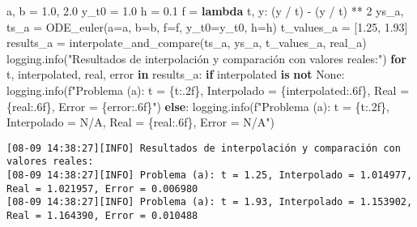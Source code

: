 \documentclass[
  letterpaper,
  DIV=11,
  numbers=noendperiod]{scrartcl}
\newenvironment{Shaded}{\begin{snugshade}}{\end{snugshade}}
\newcommand{\ControlFlowTok}[1]{\textcolor[rgb]{0.00,0.23,0.31}{\textbf{#1}}}
\newcommand{\DecValTok}[1]{\textcolor[rgb]{0.68,0.00,0.00}{#1}}
\newcommand{\FloatTok}[1]{\textcolor[rgb]{0.68,0.00,0.00}{#1}}
\newcommand{\KeywordTok}[1]{\textcolor[rgb]{0.00,0.23,0.31}{\textbf{#1}}}
\newcommand{\NormalTok}[1]{\textcolor[rgb]{0.00,0.23,0.31}{#1}}
\newcommand{\OperatorTok}[1]{\textcolor[rgb]{0.37,0.37,0.37}{#1}}
\newcommand{\SpecialCharTok}[1]{\textcolor[rgb]{0.37,0.37,0.37}{#1}}
\newcommand{\SpecialStringTok}[1]{\textcolor[rgb]{0.13,0.47,0.30}{#1}}
\newcommand{\StringTok}[1]{\textcolor[rgb]{0.13,0.47,0.30}{#1}}
\newcommand{\VariableTok}[1]{\textcolor[rgb]{0.07,0.07,0.07}{#1}}
\begin{document}
\begin{Shaded}
\begin{Highlighting}[]
\NormalTok{a, b }\OperatorTok{=} \FloatTok{1.0}\NormalTok{, }\FloatTok{2.0}
\NormalTok{y\_t0 }\OperatorTok{=} \FloatTok{1.0}
\NormalTok{h }\OperatorTok{=} \FloatTok{0.1}
\NormalTok{f }\OperatorTok{=} \KeywordTok{lambda}\NormalTok{ t, y: (y }\OperatorTok{/}\NormalTok{ t) }\OperatorTok{{-}}\NormalTok{ (y }\OperatorTok{/}\NormalTok{ t) }\OperatorTok{**} \DecValTok{2}
\NormalTok{ys\_a, ts\_a }\OperatorTok{=}\NormalTok{ ODE\_euler(a}\OperatorTok{=}\NormalTok{a, b}\OperatorTok{=}\NormalTok{b, f}\OperatorTok{=}\NormalTok{f, y\_t0}\OperatorTok{=}\NormalTok{y\_t0, h}\OperatorTok{=}\NormalTok{h)}
\NormalTok{t\_values\_a }\OperatorTok{=}\NormalTok{ [}\FloatTok{1.25}\NormalTok{, }\FloatTok{1.93}\NormalTok{]}
\NormalTok{results\_a }\OperatorTok{=}\NormalTok{ interpolate\_and\_compare(ts\_a, ys\_a, t\_values\_a, real\_a)}
\NormalTok{logging.info(}\StringTok{"Resultados de interpolación y comparación con valores reales:"}\NormalTok{)}
\ControlFlowTok{for}\NormalTok{ t, interpolated, real, error }\KeywordTok{in}\NormalTok{ results\_a:}
    \ControlFlowTok{if}\NormalTok{ interpolated }\KeywordTok{is} \KeywordTok{not} \VariableTok{None}\NormalTok{:}
\NormalTok{        logging.info(}\SpecialStringTok{f"Problema (a): t = }\SpecialCharTok{\{}\NormalTok{t}\SpecialCharTok{:.2f\}}\SpecialStringTok{, Interpolado = }\SpecialCharTok{\{}\NormalTok{interpolated}\SpecialCharTok{:.6f\}}\SpecialStringTok{, Real = }\SpecialCharTok{\{}\NormalTok{real}\SpecialCharTok{:.6f\}}\SpecialStringTok{, Error = }\SpecialCharTok{\{}\NormalTok{error}\SpecialCharTok{:.6f\}}\SpecialStringTok{"}\NormalTok{)}
    \ControlFlowTok{else}\NormalTok{:}
\NormalTok{        logging.info(}\SpecialStringTok{f"Problema (a): t = }\SpecialCharTok{\{}\NormalTok{t}\SpecialCharTok{:.2f\}}\SpecialStringTok{, Interpolado = N/A, Real = }\SpecialCharTok{\{}\NormalTok{real}\SpecialCharTok{:.6f\}}\SpecialStringTok{, Error = N/A"}\NormalTok{)}
\end{Highlighting}
\end{Shaded}

\begin{verbatim}
[08-09 14:38:27][INFO] Resultados de interpolación y comparación con valores reales:
[08-09 14:38:27][INFO] Problema (a): t = 1.25, Interpolado = 1.014977, Real = 1.021957, Error = 0.006980
[08-09 14:38:27][INFO] Problema (a): t = 1.93, Interpolado = 1.153902, Real = 1.164390, Error = 0.010488
\end{verbatim}
\end{document}
